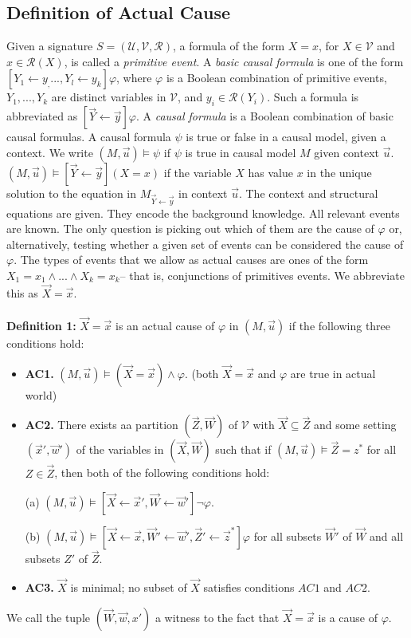 \documentclass{article}
\begin{document}
\subsection{Definition of Actual Cause}
Given a signature $S= (\mathcal{U},\mathcal{V},\mathcal{R})$, a formula of the form $X =x$, for $X \in \mathcal{V}$ and $x \in \mathcal{R}(X)$, is called a \textit{primitive event}.
A \textit{basic causal formula} is one of the form $[Y_1 \leftarrow y_, ..., Y_l\leftarrow y_k]\varphi$, where $\varphi$ is a Boolean combination of primitive events, $Y_1,...,Y_k$ are distinct variables in $\mathcal{V}$, and $y_i \in \mathcal{R}(Y_i)$.
Such a formula is abbreviated as $[\vec{Y}\leftarrow\vec{y}]\varphi$.
A \textit{causal formula} is a Boolean combination of basic causal formulas.
A causal formula $\psi$ is true or false in a causal model, given a context.
We write $(M,\vec u)\models \psi$ if $\psi$ is true in causal model $M$ given context $\vec u$.
$(M,\vec u)\models [\vec Y\leftarrow \vec y](X=x)$ if the variable $X$ has value $x$ in the unique solution to the equation in $M_{\vec{Y} \leftarrow \vec{y}}$ in context $\vec u$.
The context and structural equations are given.
They encode the background knowledge.
All relevant events are known.
The only question is picking out which of them are the cause of $\varphi$ or, alternatively, testing whether a given set of events can be considered the cause of $\varphi$.
The types of events that we allow as actual causes are ones of the form $X_1 = x_1 \wedge ... \wedge X_k=x_k$-- that is, conjunctions of primitives events.
We abbreviate this as $\vec X = \vec x$.
\\
\\
\textbf{Definition 1:} $\vec X = \vec x$ is an actual cause of $\varphi$ in $(M,\vec u)$ if the following three conditions hold:
\begin{itemize}
    \item  \textbf{AC1.} $(M,\vec u)\models (\vec X = \vec x) \wedge \varphi$. 
    (both $\vec X = \vec x$ and $\varphi$ are true in actual world)
    \item  \textbf{AC2. }There exists aa partition $(\vec Z, \vec W)$ of $\mathcal{V}$ with $\vec X \subseteq \vec Z$ and some setting $(\vec x',\vec w')$ of the variables in $(\vec X,\vec W)$ such that if $(M,\vec u)\models \vec Z = z^*$ for all $Z\in \vec Z$, then both of the following conditions hold:
    
(a) $(M,\vec u)\models[\vec X \leftarrow \vec x', \vec W \leftarrow \vec w']\neg \varphi$. 

(b) $(M,\vec u)\models[\vec X\leftarrow \vec x, \vec W' \leftarrow \vec w', \vec Z'\leftarrow \vec z^*]\varphi$ for all subsets $\vec W'$ of $\vec W$ and all subsets $Z'$ of $\vec Z$.

    \item  \textbf{AC3.} $\vec X$ is minimal; no subset of $\vec X$ satisfies conditions $AC1$ and $AC2$.
\end{itemize}
We call the tuple $(\vec W, \vec w,x')$ a witness to the fact that $\vec X=\vec x$ is a cause of $\varphi$.
\end{document}
